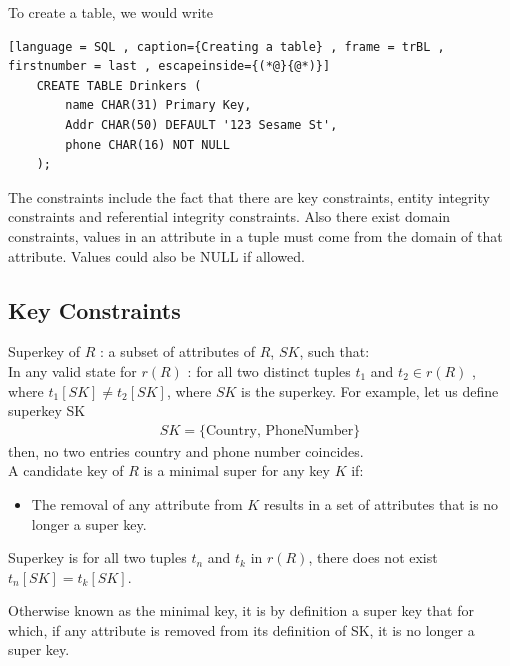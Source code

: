 \documentclass[a4paper]{article}
\theoremstyle{plain}
\theoremstyle{definition}
\newtheorem{defn}{Definition}[section]
\theoremstyle{remark}
\begin{document}
	To create a table, we would write
	\begin{lstlisting}[language = SQL , caption={Creating a table} , frame = trBL , firstnumber = last , escapeinside={(*@}{@*)}]
	CREATE TABLE Drinkers (
		name CHAR(31) Primary Key,
		Addr CHAR(50) DEFAULT '123 Sesame St',
		phone CHAR(16) NOT NULL
	);
	\end{lstlisting}
	The constraints include the fact that there are key constraints, entity integrity constraints and referential integrity constraints. Also there exist domain constraints, values in an attribute in a tuple must come from the domain of that attribute. Values could also be NULL if allowed. 
	\subsection{Key Constraints}
	Superkey of $R$ : a subset of attributes of $R$, $SK$, such that: \\
	In any valid state for $r(R)$ : for all two distinct tuples $t_1$ and $t_2 \in r(R)$ , where $t_1[SK] \neq  t_2[SK]$, where $SK $ is the superkey. For example, let us define superkey SK 
	\begin{align*}
		SK = \{\text{Country, PhoneNumber}\}
	\end{align*}
	then, no two entries country and phone number coincides. \\
	A candidate key of $R$ is a minimal super for any key $K$ if:
	\begin{itemize}
		\item The removal of any attribute from $K$ results in a set of attributes that is no longer a super key.
	\end{itemize}
	\begin{tcolorbox}[colback=black!3!white,colframe=black!60!white,title=\begin{defn}Superkey \label{Superkey}\end{defn}]
	Superkey is for all two tuples $t_n$ and $t_k$ in $r(R)$, there does not exist $t_n[SK]=t_k[SK]$.
	\end{tcolorbox}
	\begin{tcolorbox}[colback=black!6!white,colframe=black!60!white,title=\begin{defn}Candidate Key \label{Candidate Key}\end{defn}]
	Otherwise known as the minimal key, it is by definition a super key that for which, if any attribute is removed from its definition of SK, it is no longer a super key.
	\end{tcolorbox}
\end{document}
